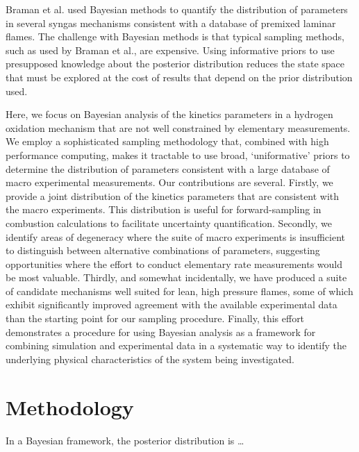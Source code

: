 \documentclass[preprint,3p,times,twocolumn]{elsarticle}
\begin{document}
Braman et al. \cite{BramanOR13} used Bayesian methods to quantify the
distribution of parameters in several syngas mechanisms consistent
with a database of premixed laminar flames. The challenge with
Bayesian methods is that typical sampling methods, such as used by
Braman et al., are expensive. Using informative priors to use
presupposed knowledge about the posterior distribution reduces the
state space that must be explored at the cost of results that depend
on the prior distribution used.

Here, we focus on Bayesian analysis of the kinetics parameters in a
hydrogen oxidation mechanism that are not well constrained by
elementary measurements. We employ a sophisticated sampling
methodology that, combined with high performance computing, makes it
tractable to use broad, `uniformative' priors to determine the
distribution of parameters consistent with a large database of macro
experimental measurements. Our contributions are several. Firstly, we
provide a joint distribution of the kinetics parameters that are
consistent with the macro experiments.  This distribution is useful
for forward-sampling in combustion calculations to facilitate
uncertainty quantification. Secondly, we identify areas of degeneracy
where the suite of macro experiments is insufficient to distinguish
between alternative combinations of parameters, suggesting
opportunities where the effort to conduct elementary rate measurements
would be most valuable. Thirdly, and somewhat incidentally, we have
produced a suite of candidate mechanisms well suited for lean, high
pressure flames, some of which exhibit significantly improved
agreement with the available experimental data than the starting point
for our sampling procedure. Finally, this effort demonstrates a
procedure for using Bayesian analysis as a framework for combining
simulation and experimental data in a systematic way to identify the
underlying physical characteristics of the system being investigated.

\section{Methodology}
In a Bayesian framework, the posterior distribution is \ldots
\end{document}
